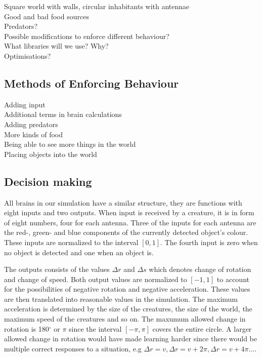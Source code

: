 \documentclass[a4paper,11pt]{kth-mag}
\begin{document}
Square world with walls, circular inhabitants with antennae\\
Good and bad food sources\\
Predators?\\
Possible modifications to enforce different behaviour?\\
What libraries will we use? Why?\\
Optimisations?\\

\subsection{Methods of Enforcing Behaviour}
Adding input\\
Additional terms in brain calculations\\
Adding predators\\
More kinds of food\\
Being able to see more things in the world\\
Placing objects into the world\\
\subsection{Decision making}
All brains in our simulation have a similar structure, they are functions with eight inputs and two outputs. When input is received by a creature, it is in form of eight numbers, four for each antenna. Three of the inputs for each antenna are the red-, green- and blue components of the currently detected object's colour. These inputs are normalized to the interval $[0,1]$. The fourth input is zero when no object is detected and one when an object is. 

The outputs consists of the values $\Delta r$ and $\Delta s$ which denotes change of rotation and change of speed. Both output values are normalized to $[-1,1]$ to account for the possibilities of negative rotation and negative acceleration. These values are then translated into reasonable values in the simulation. The maximum acceleration is determined by the size of the creatures, the size of the world, the maximum speed of the creatures and so on. The maxumum allowed change in rotation is 180$^\circ$ or $\pi$ since the interval $[-\pi,\pi]$ covers the entire circle. A larger allowed change in rotation would have made learning harder since there would be multiple correct responses to a situation, e.g $\Delta r = v, \Delta r = v+ 2\pi, \Delta r = v+ 4\pi \dots $.
\end{document}

